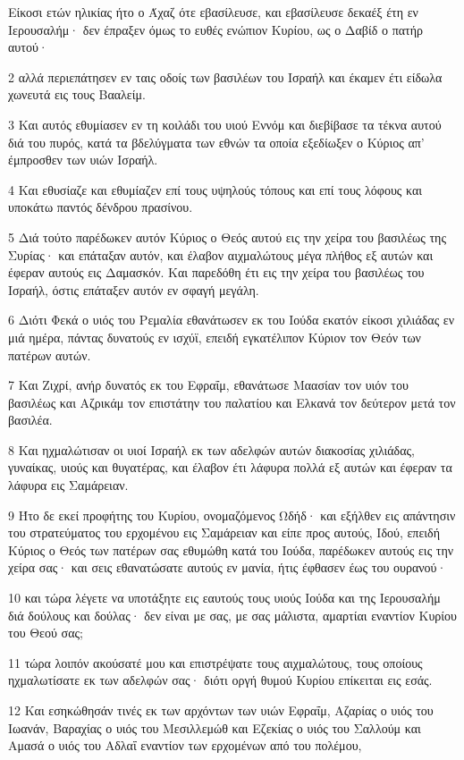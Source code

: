 \par Είκοσι ετών ηλικίας ήτο ο Άχαζ ότε εβασίλευσε, και εβασίλευσε δεκαέξ έτη εν Ιερουσαλήμ· δεν έπραξεν όμως το ευθές ενώπιον Κυρίου, ως ο Δαβίδ ο πατήρ αυτού·
\par 2 αλλά περιεπάτησεν εν ταις οδοίς των βασιλέων του Ισραήλ και έκαμεν έτι είδωλα χωνευτά εις τους Βααλείμ.
\par 3 Και αυτός εθυμίασεν εν τη κοιλάδι του υιού Εννόμ και διεβίβασε τα τέκνα αυτού διά του πυρός, κατά τα βδελύγματα των εθνών τα οποία εξεδίωξεν ο Κύριος απ' έμπροσθεν των υιών Ισραήλ.
\par 4 Και εθυσίαζε και εθυμίαζεν επί τους υψηλούς τόπους και επί τους λόφους και υποκάτω παντός δένδρου πρασίνου.
\par 5 Διά τούτο παρέδωκεν αυτόν Κύριος ο Θεός αυτού εις την χείρα του βασιλέως της Συρίας· και επάταξαν αυτόν, και έλαβον αιχμαλώτους μέγα πλήθος εξ αυτών και έφεραν αυτούς εις Δαμασκόν. Και παρεδόθη έτι εις την χείρα του βασιλέως του Ισραήλ, όστις επάταξεν αυτόν εν σφαγή μεγάλη.
\par 6 Διότι Φεκά ο υιός του Ρεμαλία εθανάτωσεν εκ του Ιούδα εκατόν είκοσι χιλιάδας εν μιά ημέρα, πάντας δυνατούς εν ισχύϊ, επειδή εγκατέλιπον Κύριον τον Θεόν των πατέρων αυτών.
\par 7 Και Ζιχρί, ανήρ δυνατός εκ του Εφραΐμ, εθανάτωσε Μαασίαν τον υιόν του βασιλέως και Αζρικάμ τον επιστάτην του παλατίου και Ελκανά τον δεύτερον μετά τον βασιλέα.
\par 8 Και ηχμαλώτισαν οι υιοί Ισραήλ εκ των αδελφών αυτών διακοσίας χιλιάδας, γυναίκας, υιούς και θυγατέρας, και έλαβον έτι λάφυρα πολλά εξ αυτών και έφεραν τα λάφυρα εις Σαμάρειαν.
\par 9 Ήτο δε εκεί προφήτης του Κυρίου, ονομαζόμενος Ωδήδ· και εξήλθεν εις απάντησιν του στρατεύματος του ερχομένου εις Σαμάρειαν και είπε προς αυτούς, Ιδού, επειδή Κύριος ο Θεός των πατέρων σας εθυμώθη κατά του Ιούδα, παρέδωκεν αυτούς εις την χείρα σας· και σεις εθανατώσατε αυτούς εν μανία, ήτις έφθασεν έως του ουρανού·
\par 10 και τώρα λέγετε να υποτάξητε εις εαυτούς τους υιούς Ιούδα και της Ιερουσαλήμ διά δούλους και δούλας· δεν είναι με σας, με σας μάλιστα, αμαρτίαι εναντίον Κυρίου του Θεού σας;
\par 11 τώρα λοιπόν ακούσατέ μου και επιστρέψατε τους αιχμαλώτους, τους οποίους ηχμαλωτίσατε εκ των αδελφών σας· διότι οργή θυμού Κυρίου επίκειται εις εσάς.
\par 12 Και εσηκώθησάν τινές εκ των αρχόντων των υιών Εφραΐμ, Αζαρίας ο υιός του Ιωανάν, Βαραχίας ο υιός του Μεσιλλεμώθ και Εζεκίας ο υιός του Σαλλούμ και Αμασά ο υιός του Αδλαΐ εναντίον των ερχομένων από του πολέμου,
